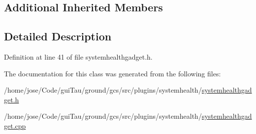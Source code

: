 \subsection*{Additional Inherited Members}


\subsection{Detailed Description}


Definition at line 41 of file systemhealthgadget.\-h.



The documentation for this class was generated from the following files\-:\begin{DoxyCompactItemize}
\item 
/home/jose/\-Code/gui\-Tau/ground/gcs/src/plugins/systemhealth/\hyperlink{systemhealthgadget_8h}{systemhealthgadget.\-h}\item 
/home/jose/\-Code/gui\-Tau/ground/gcs/src/plugins/systemhealth/\hyperlink{systemhealthgadget_8cpp}{systemhealthgadget.\-cpp}\end{DoxyCompactItemize}
